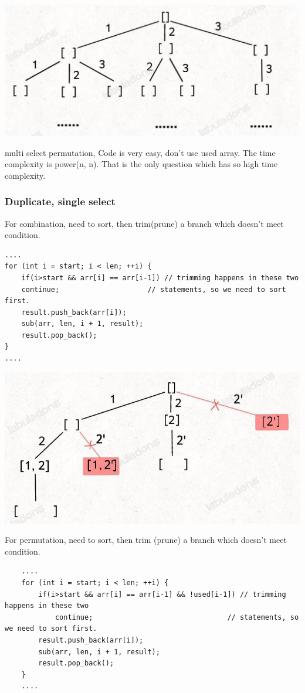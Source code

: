 \documentclass[a4paper,11pt,twoside]{book}
\begin{document}
\begin{center}
	\includegraphics[width=0.5\linewidth]{pics/sub_multi}
\end{center}

	\par multi select permutation, Code is very easy, don't use used array. The time complexity is power(n, n). That is the only question which has so high time complexity. 
	


\subsubsection{Duplicate, single select}

	
	\par For combination, need to sort, then trim(prune) a branch which doesn't meet condition. 
\begin{lstlisting}
....
for (int i = start; i < len; ++i) {
	if(i>start && arr[i] == arr[i-1]) // trimming happens in these two 
	continue;                     // statements, so we need to sort first. 
	result.push_back(arr[i]);  
	sub(arr, len, i + 1, result);
	result.pop_back();
}	
....	
\end{lstlisting}

\begin{center}
	\includegraphics[width=0.5\linewidth]{pics/com_duplicate}
\end{center}
	

	\par For permutation, need to sort, then trim (prune) a branch which doesn't meet condition. 
\begin{lstlisting}
	....
	for (int i = start; i < len; ++i) {
		if(i>start && arr[i] == arr[i-1] && !used[i-1]) // trimming happens in these two 
			continue;                                // statements, so we need to sort first. 
		result.push_back(arr[i]);  
		sub(arr, len, i + 1, result);
		result.pop_back();
	}	
	....
\end{lstlisting}
\end{document}
